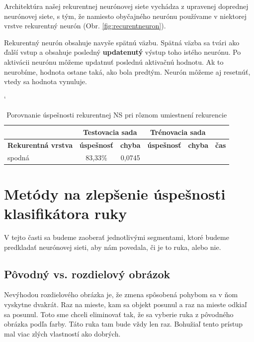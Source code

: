 Architektúra našej rekurentnej neurónovej siete vychádza z upravenej doprednej neurónovej siete, s tým, že namiesto obyčajného neurónu používame v niektorej vrstve rekurentný neurón (Obr. \ref{fig:recurentneuron}).

Rekurentný neurón obsahuje navyše spätnú väzbu. Spätná väzba sa tvári ako ďalší vstup a obsahuje posledný \textbf{updatenutý} výstup toho istého neurónu. Po aktivácii neurónu môžeme updatnuť poslednú aktivačnú hodnotu. Ak to neurobíme, hodnota ostane taká, ako bola predtým. Neurón môžeme aj resetnúť, vtedy sa hodnota vynuluje.

\begin{table}[h]
\catcode` %
\centering
\begin{tabular}{|l|c|c|c|c|c|}
\cline{2-5}
\multicolumn{1}{l}{} & \multicolumn{2}{|c|}{\textbf{Testovacia sada}} & \multicolumn{2}{c|}{\textbf{Trénovacia sada}} & \multicolumn{1}{l}{}\\ 
\hline
\textbf{Rekurentná vrstva} & \textbf{úspešnosť} & \textbf{chyba} & \textbf{úspešnosť} & \textbf{chyba} & \textbf{čas} \\ \hline
spodná & 83,33\% & 0,0745 & & &\\ \hline
\end{tabular}
\caption{Porovnanie úspešnosti rekurentnej NS pri rôznom umiestnení rekurencie}
\label{tab:neuroncountcmp2}
\end{table}


\section{Metódy na zlepšenie úspešnosti klasifikátora ruky}
\label{sect:metodyzlepseniaklasifikacie}

V tejto časti sa budeme zaoberať jednotlivými segmentami, ktoré budeme predkladať neurónovej sieti, aby nám povedala, či je to ruka, alebo nie.

\subsection{Pôvodný vs. rozdielový obrázok}
Nevýhodou rozdielového obrázka je, že zmena spôsobená pohybom sa v ňom vyskytne dvakrát. Raz na mieste, kam sa objekt posunul a raz na mieste odkiaľ sa posunul. Toto sme chceli eliminovať tak, že sa vyberie ruka z pôvodného obrázka podľa farby. Táto ruka tam bude vždy len raz. Bohužiaľ tento prístup mal viac zlých vlastností ako dobrých.

